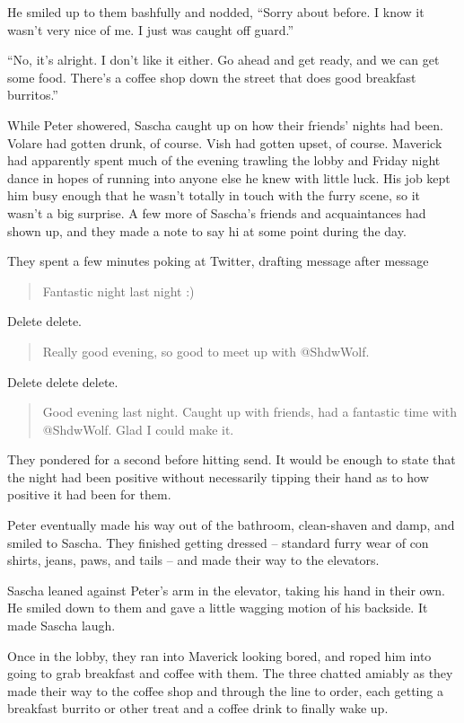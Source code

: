 He smiled up to them bashfully and nodded, ``Sorry about before. I know it wasn't very nice of me. I just was caught off guard.''

``No, it's alright. I don't like it either. Go ahead and get ready, and we can get some food. There's a coffee shop down the street that does good breakfast burritos.''

While Peter showered, Sascha caught up on how their friends' nights had been. Volare had gotten drunk, of course. Vish had gotten upset, of course. Maverick had apparently spent much of the evening trawling the lobby and Friday night dance in hopes of running into anyone else he knew with little luck. His job kept him busy enough that he wasn't totally in touch with the furry scene, so it wasn't a big surprise. A few more of Sascha's friends and acquaintances had shown up, and they made a note to say hi at some point during the day.

They spent a few minutes poking at Twitter, drafting message after message

\begin{quote}
  Fantastic night last night :)
\end{quote}

Delete delete.

\begin{quote}
  Really good evening, so good to meet up with @ShdwWolf.
\end{quote}

Delete delete delete.

\begin{quote}
  Good evening last night. Caught up with friends, had a fantastic time with @ShdwWolf. Glad I could make it.
\end{quote}

They pondered for a second before hitting send. It would be enough to state that the night had been positive without necessarily tipping their hand as to how positive it had been for them.

Peter eventually made his way out of the bathroom, clean-shaven and damp, and smiled to Sascha. They finished getting dressed -- standard furry wear of con shirts, jeans, paws, and tails -- and made their way to the elevators.

Sascha leaned against Peter's arm in the elevator, taking his hand in their own. He smiled down to them and gave a little wagging motion of his backside. It made Sascha laugh.

Once in the lobby, they ran into Maverick looking bored, and roped him into going to grab breakfast and coffee with them. The three chatted amiably as they made their way to the coffee shop and through the line to order, each getting a breakfast burrito or other treat and a coffee drink to finally wake up.

